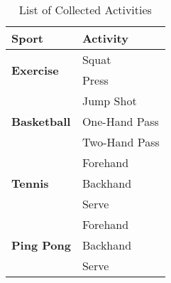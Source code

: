 \begin{table}[h]
\caption{List of Collected Activities}
\centering
\begin{tabular}{|l|l|}
\hline
\textbf{Sport}                        & \textbf{Activity} \\ \hline
\multirow{2}{*}{\textbf{Exercise}}   & Squat             \\ \cline{2-2} 
                                     & Press             \\ \hline
\multirow{3}{*}{\textbf{Basketball}} & Jump Shot         \\ \cline{2-2} 
                                     & One-Hand Pass     \\ \cline{2-2} 
                                     & Two-Hand Pass     \\ \hline
\multirow{3}{*}{\textbf{Tennis}}     & Forehand          \\ \cline{2-2} 
                                     & Backhand          \\ \cline{2-2} 
                                     & Serve             \\ \hline
\multirow{3}{*}{\textbf{Ping Pong}}  & Forehand          \\ \cline{2-2} 
                                     & Backhand          \\ \cline{2-2} 
                                     & Serve             \\ \hline
\end{tabular}
\label{table-activities}
\end{table}